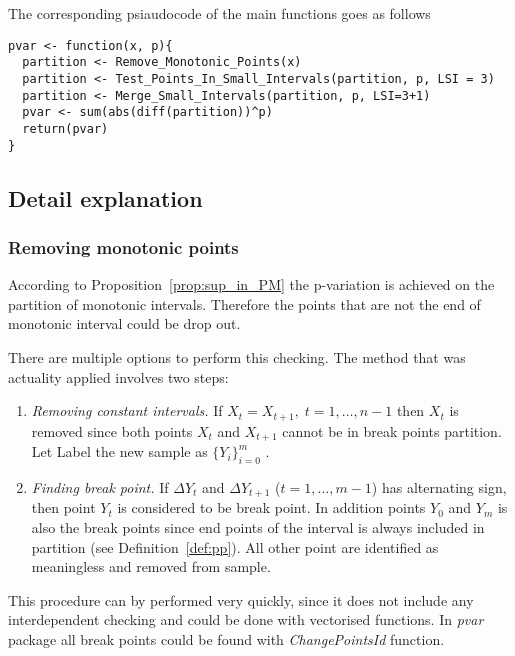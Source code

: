 \documentclass[12pt, a4paper]{article}
\numberwithin{equation}{section}
\begin{document}
The corresponding psiaudocode of the main functions goes as follows
\begin{lstlisting}
pvar <- function(x, p){
  partition <- Remove_Monotonic_Points(x) 
  partition <- Test_Points_In_Small_Intervals(partition, p, LSI = 3) 
  partition <- Merge_Small_Intervals(partition, p, LSI=3+1)
  pvar <- sum(abs(diff(partition))^p)  
  return(pvar)
}
\end{lstlisting}
  
\subsection{Detail explanation}

\subsubsection{Removing monotonic points}

According to Proposition~\ref{prop:sup_in_PM}
the p-variation is achieved 
on the partition of monotonic intervals. Therefore the points that are not the end of monotonic interval could be drop out. 

There are multiple options to perform this checking. The method
that was actuality applied involves two steps:

\begin{enumerate}
  \item \emph{Removing constant intervals.} 
  If  $X_{t}=X_{t+1},\;t=1,\dots,n-1$ then $X_t$ is removed
  since both points $X_{t}$ and $X_{t+1}$ cannot be in break points
  partition. Let Label the new sample as  $\{Y_{i}\}_{i=0}^{m}$ .
  
  \item \emph{Finding break point.}  
  If $\Delta Y_{t}$ and $\Delta Y_{t+1}$ ($t=1,\dots,m-1$)
  has alternating sign, then point $Y_t$ is considered 
  to be break point. In addition points $Y_0$ and $Y_m$ 
  is also the break points since end points of 
  the interval is always included in partition (see
  Definition~\ref{def:pp}). All other point are identified as
  meaningless and removed from sample.  

\end{enumerate}


This procedure can by performed very quickly, since it does not include
any interdependent checking and could be done with vectorised functions.
In \emph{pvar} package all break points could be found with \emph{ChangePointsId} function.
\end{document}
